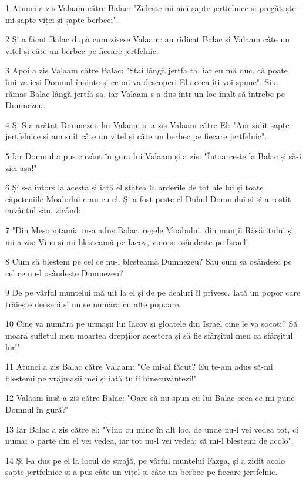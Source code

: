 \par 1 Atunci a zis Valaam către Balac: "Zidește-mi aici șapte jertfelnice și pregătește-mi șapte viței și șapte berbeci".
\par 2 Și a făcut Balac după cum zisese Valaam: au ridicat Balac și Valaam câte un vițel și câte un berbec pe fiecare jertfelnic.
\par 3 Apoi a zis Valaam către Balac: "Stai lângă jertfa ta, iar eu mă duc, că poate îmi va ieși Domnul înainte și ce-mi va descoperi El aceea îți voi spune". Și a rămas Balac lângă jertfa sa, iar Valaam s-a dus într-un loc înalt să întrebe pe Dumnezeu.
\par 4 Și S-a arătat Dumnezeu lui Valaam și a zis Valaam către El: "Am zidit șapte jertfelnice și am suit câte un vițel și câte un berbec pe fiecare jertfelnic".
\par 5 Iar Domnul a pus cuvânt în gura lui Valaam și a zis: "Întoarce-te la Balac și să-i zici așa!"
\par 6 Și s-a întors la acesta și iată el stătea la arderile de tot ale lui și toate căpeteniile Moabului erau cu el. Și a fost peste el Duhul Domnului și și-a rostit cuvântul său, zicând:
\par 7 "Din Mesopotamia m-a adus Balac, regele Moabului, din munții Răsăritului și mi-a zis: Vino și-mi blesteamă pe Iacov, vino și osândește pe Israel!
\par 8 Cum să blestem pe cel ce nu-l blesteamă Dumnezeu? Sau cum să osândesc pe cel ce nu-l osândește Dumnezeu?
\par 9 De pe vârful muntelui mă uit la el și de pe dealuri îl privesc. Iată un popor care trăiește deosebi și nu se numără cu alte popoare.
\par 10 Cine va număra pe urmașii lui Iacov și gloatele din Israel cine le va socoti? Să moară sufletul meu moartea drepților acestora și să fie sfârșitul meu ca sfârșitul lor!"
\par 11 Atunci a zis Balac către Valaam: "Ce mi-ai făcut? Eu te-am adus să-mi blestemi pe vrăjmașii mei și iată tu îi binecuvântezi!"
\par 12 Valaam însă a zis către Balac: "Oare să nu spun eu lui Balac ceea ce-mi pune Domnul în gură?"
\par 13 Iar Balac a zis către el: "Vino cu mine în alt loc, de unde nu-l vei vedea tot, ci numai o parte din el vei vedea, iar tot nu-l vei vedea: să mi-l blestemi de acolo".
\par 14 Și l-a dus pe el la locul de strajă, pe vârful muntelui Fazga, și a zidit acolo șapte jertfelnice și a pus câte un vițel și câte un berbec pe fiecare jertfelnic.
